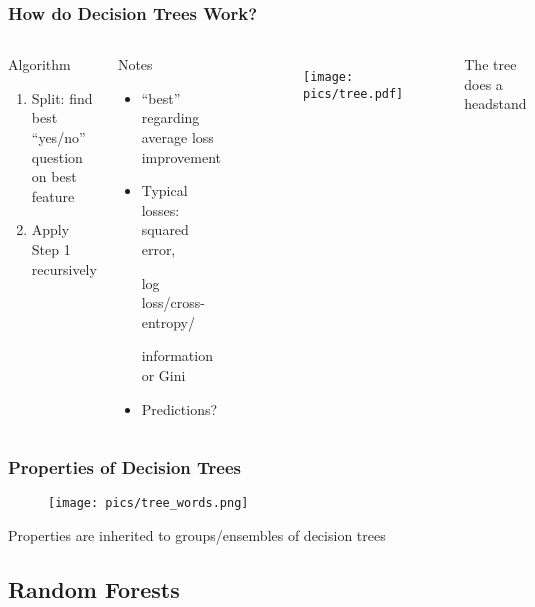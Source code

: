 \documentclass[
    utf8,
    aspectratio=169
]{beamer}  %
\begin{document}
\begin{frame}
	\frametitle{How do Decision Trees Work?}
	\begin{columns}[onlytextwidth]
		\begin{block}{Algorithm}
			\begin{enumerate}
				\item Split: find best ``yes/no'' question on best feature		
				\item Apply Step 1 recursively
			\end{enumerate}
		\end{block}
	
		\begin{exampleblock}{Notes}
			\begin{itemize}
				\item ``best'' regarding average loss improvement
				\item Typical losses: squared error, 
				
				log loss/cross-entropy/ 
				
				information or Gini
				\item Predictions?
			\end{itemize}
		\end{exampleblock}
	
		\begin{example}
		\end{example}
	
		\begin{figure}
			\texttt{[image: pics/tree.pdf]}
		\end{figure}
		\centering The tree does a headstand
	\end{columns}
\end{frame}

\begin{frame}
	\frametitle{Properties of Decision Trees}
	\begin{figure}
		\texttt{[image: pics/tree\_words.png]}
	\end{figure}
	
	\vfill
	
	\centering Properties are inherited to groups/ensembles of decision trees
\end{frame}

\subsection{Random Forests}
\end{document}
